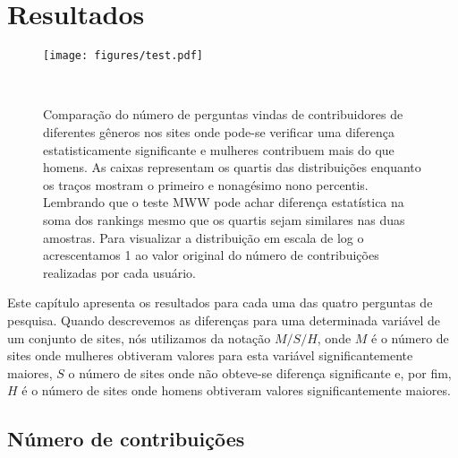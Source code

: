\chapter{Resultados}

\begin{figure}
  \raggedleft
  \texttt{[image: figures/test.pdf]}
  \caption[Comparação do número de perguntas]{Comparação do número de perguntas vindas de contribuidores de diferentes gêneros nos sites onde pode-se verificar uma diferença estatisticamente significante e mulheres contribuem mais do que homens. As caixas representam os quartis das distribuições enquanto os traços mostram o primeiro e nonagésimo nono percentis. Lembrando que o teste MWW pode achar diferença estatística na soma dos rankings mesmo que os quartis sejam similares nas duas amostras. Para visualizar a distribuição em escala de log o acrescentamos 1 ao valor original do número de contribuições realizadas por cada usuário. }~\label{figure:questions}
\end{figure}


Este capítulo apresenta os resultados para cada uma das quatro perguntas de pesquisa. Quando descrevemos as diferenças para uma determinada variável de um conjunto de sites, nós utilizamos da notação $M/S/H$, onde $M$ é o número de sites onde mulheres obtiveram valores para esta variável significantemente maiores, $S$ o número de sites onde não obteve-se diferença significante e, por fim, $H$ é o número de sites onde homens obtiveram valores significantemente maiores.

\section{Número de contribuições}

